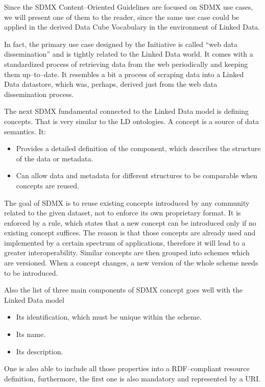 Since the SDMX Content--Oriented Guidelines are focused on SDMX use cases, we will present
one of them to the reader, since the same use case could be applied in the derived Data Cube
Vocabulary in the environment of Linked Data.

In fact, the primary use case designed by the Initiative is called “web data dissemination”
and is tightly related to the Linked Data world. It comes with a standardized process of retrieving
data from the web periodically and keeping them up--to--date. It resembles a bit a process
of scraping data into a Linked Data datastore, which was, perhaps, derived just from the web
data dissemination process.

The next SDMX fundamental connected to the Linked Data model is defining concepts. That is
very similar to the LD ontologies. A concept is a source of data semantics. It:

\begin{itemize}
\item Provides a detailed definition of the component, which describes the structure of the data or
metadata.
\item Can allow data and metadata for different structures to be comparable when concepts are reused.
\end{itemize}

The goal of SDMX is to reuse existing concepts introduced by any community related to the
given dataset, not to enforce its own proprietary format. It is enforced by a rule, which states
that a new concept can be introduced only if no existing concept suffices. The reason
is that those concepts are already used and implemented by a certain spectrum of
applications, therefore it will lead to a greater interoperability. Similar concepts are then
grouped into schemes which are versioned. When a concept changes, a new version of the
whole scheme needs to be introduced.

Also the list of three main components of SDMX concept goes well with the Linked Data model

\begin{itemize}
\item Its identification, which must be unique within the scheme.
\item Its name.
\item Its description.
\end{itemize}

One is also able to include all those properties into a RDF--compliant resource definition,
furthermore, the first one is also mandatory and represented by a URI.

